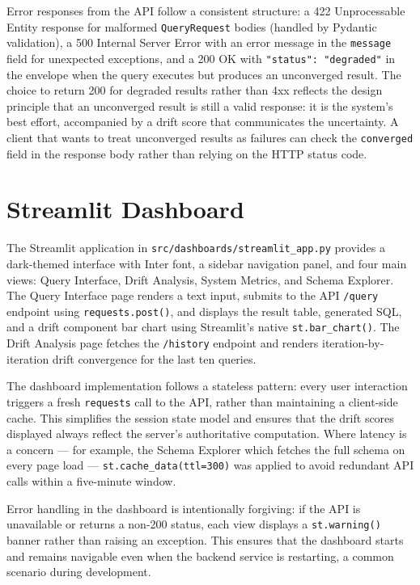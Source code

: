 \documentclass[12pt,a4paper]{report}
\begin{document}
Error responses from the API follow a consistent structure: a 422 Unprocessable Entity response for malformed \texttt{QueryRequest} bodies (handled by Pydantic validation), a 500 Internal Server Error with an error message in the \texttt{message} field for unexpected exceptions, and a 200 OK with \texttt{"status": "degraded"} in the envelope when the query executes but produces an unconverged result. The choice to return 200 for degraded results rather than 4xx reflects the design principle that an unconverged result is still a valid response: it is the system's best effort, accompanied by a drift score that communicates the uncertainty. A client that wants to treat unconverged results as failures can check the \texttt{converged} field in the response body rather than relying on the HTTP status code.

\section{Streamlit Dashboard}
\label{sec:streamlit-impl}

The Streamlit application in \texttt{src/dashboards/streamlit\_app.py} provides a dark-themed interface with Inter font, a sidebar navigation panel, and four main views: Query Interface, Drift Analysis, System Metrics, and Schema Explorer. The Query Interface page renders a text input, submits to the \ac{API} \texttt{/query} endpoint using \texttt{requests.post()}, and displays the result table, generated \ac{SQL}, and a drift component bar chart using Streamlit's native \texttt{st.bar\_chart()}. The Drift Analysis page fetches the \texttt{/history} endpoint and renders iteration-by-iteration drift convergence for the last ten queries.

The dashboard implementation follows a stateless pattern: every user interaction triggers a fresh \texttt{requests} call to the \ac{API}, rather than maintaining a client-side cache. This simplifies the session state model and ensures that the drift scores displayed always reflect the server's authoritative computation. Where latency is a concern — for example, the Schema Explorer which fetches the full schema on every page load — \texttt{st.cache\_data(ttl=300)} was applied to avoid redundant API calls within a five-minute window.

Error handling in the dashboard is intentionally forgiving: if the \ac{API} is unavailable or returns a non-200 status, each view displays a \texttt{st.warning()} banner rather than raising an exception. This ensures that the dashboard starts and remains navigable even when the backend service is restarting, a common scenario during development.
\end{document}
